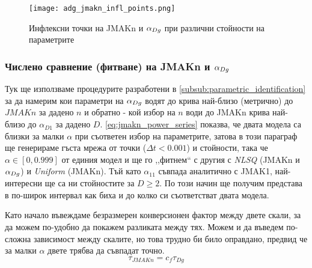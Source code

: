 \begin{table}[hbpt]
\centering
{}
\caption{Инфлексни точки на JMAKn при различни стойности на $n$}
\label{tabl:jmak_infl_points}
\end{table}
\begin{figure}[hbtp]
    \centering
    \texttt{[image: adg\_jmakn\_infl\_points.png]}
    \caption{Инфлексни точки на JMAKn и $\alpha_{Dg}$ при различни стойности на параметрите}
    \label{fig:infl_points_curves}
\end{figure}
\subsubsection{Числено сравнение (фитване) на JMAKn и \texorpdfstring{$\alpha_{Dg}$}{αDg}}
Тук ще използваме процедурите разработени в \autoref{subsub:parametric_identification} за да намерим кои параметри на $\alpha_{Dg}$ водят до крива най-близо (метрично) до $JMAKn$ за дадено $n$ и обратно - кой избор на $n$ води до JMAKn крива най-близо до $\alpha_{D1}$ за дадено $D$.
\autoref{eq:jmakn_power_series} показва, че двата модела са близки за малки $\alpha$ при съответен избор на параметрите, затова в този параграф ще генерираме гъста мрежа от точки ($\Delta t < 0.001$) и стойности, така че $\alpha \in [0, 0.999]$ от единия модел и ще го ,,фитнем`` с другия с \textit{NLSQ} (JMAKn и $\alpha_{Dg}$) и \textit{Uniform} (JMAKn). Тъй като $\alpha_{11}$ съвпада аналитично с JMAK1, най-интересни ще са ни стойностите за  $D \ge 2$.  По този начин ще получим представа в по-широк интервал как биха и до колко си съответстват двата модела.  

Като начало въвеждаме безразмерен конверсионен фактор между двете скали, за да можем по-удобно да покажем разликата между тях. Можем и да въведем по-сложна зависимост между скалите, но това трудно би било оправдано, предвид че за малки $\alpha$ двете трябва да съвпадат точно.
\begin{equation*}
    \tau_{JMAKn} = c_{f} \tau_{Dg}
\end{equation*}

